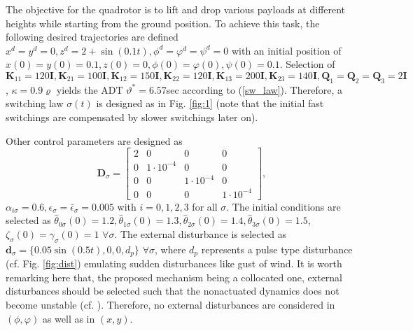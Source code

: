 The objective for the quadrotor is to lift and drop various payloads at different heights while starting from the ground position. To achieve this task, the following desired trajectories are defined $x^d=y^d=0, z^d= 2+\sin(0.1t), \phi^d=\varphi^d=\psi^d=0$ with an initial position of $ x(0)=y(0)=0.1, z(0)= 0, \phi(0)=\varphi(0),\psi(0)=0.1$. %
Selection of $\mathbf K_{11}=120\mathbf{I}, \mathbf K_{21}=100\mathbf I, \mathbf K_{12}=150\mathbf{I}, \mathbf K_{22}=120\mathbf I,     \mathbf K_{13}=200\mathbf{I}, \mathbf K_{23}=140\mathbf I, \mathbf Q_1=\mathbf Q_2=\mathbf Q_3=2\mathbf I$, $\kappa=0.9\varrho$ yields the ADT $\vartheta^{*}=6.57$sec according to (\ref{sw_law}). Therefore, a switching law $\sigma(t)$ is designed as in Fig. \ref{fig:1} (note that the initial fast switchings are compensated by slower switchings later on). %



Other control parameters are designed as $$\mathbf D_\sigma=\begin{bmatrix}
2 & 0  & 0  & 0 \\ 
0& 1\cdot10^{-4}  & 0 & 0\\ 
0 & 0  & 1\cdot10^{-4}  & 0 \\ 
0 & 0  & 0  & 1\cdot10^{-4} 
\end{bmatrix},$$
$\alpha_{i\sigma}=0.6,\epsilon_{\sigma}=\bar{\epsilon}_{\sigma}=0.005 $ with $i=0,1,2,3$ for all $\sigma$. The initial conditions are selected as $\hat{\theta}_{0\sigma}(0)=1.2,\hat{\theta}_{1\sigma}(0)=1.3,\hat{\theta}_{2\sigma}(0)=1.4,\hat{\theta}_{3\sigma}(0)=1.5 $, $\zeta_\sigma(0)=\gamma_{\sigma}(0)=1$ $\forall \sigma$. The external disturbance is selected as $\mathbf{d}_{\sigma}= \lbrace 0.05\sin(0.5t),0,0,d_p \rbrace$ $\forall \sigma$, where $d_p$ represents a pulse type disturbance (cf. Fig. \ref{fig:dist}) emulating sudden disturbances like gust of wind. It is worth remarking here that, the proposed mechanism being a collocated one, external disturbances should be selected such that the nonactuated dynamics does not become unstable (cf. \cite{shkolnik2008high,spong1994partial}). Therefore, no external disturbances are considered in $(\phi,\varphi)$ as well as in $(x,y)$.


